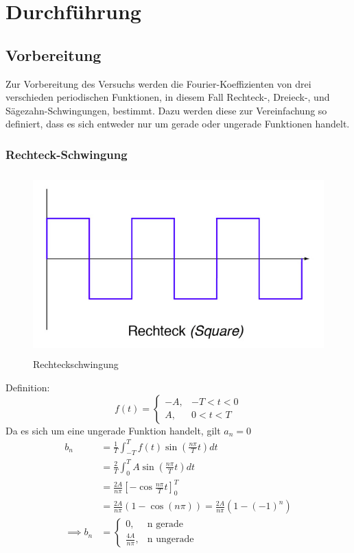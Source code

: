 \section{Durchführung}
\label{sec:Durchführung}

\subsection{Vorbereitung}
Zur Vorbereitung des Versuchs werden die Fourier-Koeffizienten von drei
verschieden periodischen Funktionen, in diesem Fall Rechteck-, Dreieck-,
und Sägezahn-Schwingungen, bestimmt. Dazu werden diese zur Vereinfachung so definiert,
dass es sich entweder nur um gerade oder ungerade Funktionen handelt.

\subsubsection{Rechteck-Schwingung}
\begin{figure}[h]
  \centering
  \includegraphics[height=7cm]{Rechteck.png}
  \caption{Rechteckschwingung \cite{Schwingungen}}
  \label{fig:reck}
\end{figure}
Definition:
\begin{equation}
  f(t)= \begin{cases}
         -A  , & -T < t < 0 \\
         A  , & 0 < t < T
      \end{cases}
\end{equation}
Da es sich um eine ungerade Funktion handelt, gilt $a_n = 0 $
\begin{align*}
  b_n &= \frac{1}{T} \int_{-T}^{T} f(t) \sin (\frac{n\pi}{T} t)dt \\
  &= \frac{2}{T} \int_0^T A \sin (\frac{n\pi}{T} t)dt \\
  &= \frac{2A}{n\pi} [-\cos \frac{n\pi}{T} t]_0^T \\
  &= \frac{2A}{n\pi} (1-\cos (n\pi)) = \frac{2A}{n\pi}(1-(-1)^n) \\
  \implies b_n &= \begin{cases}
        0  , &\text{n gerade} \\
        \frac{4A}{n\pi} , &\text{n ungerade}
      \end{cases}
  \end{align*}

